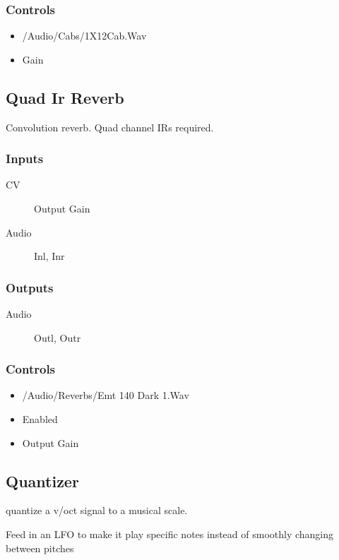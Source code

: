 \subsubsection{Controls}
\begin{itemize}
\item /Audio/Cabs/1X12Cab.Wav
\item Gain
\end{itemize}

\subsection{Quad Ir Reverb}

Convolution reverb. Quad channel IRs required.



\subsubsection{Inputs}
\begin{description}
\item [CV] Output Gain
\item [Audio] Inl, Inr
\end{description}

\subsubsection{Outputs}
\begin{description}
\item [Audio] Outl, Outr
\end{description}

\subsubsection{Controls}
\begin{itemize}
\item /Audio/Reverbs/Emt 140 Dark 1.Wav
\item Enabled
\item Output Gain
\end{itemize}

\subsection{Quantizer}

quantize a v/oct signal to a musical scale.

Feed in an LFO to make it play specific notes instead of smoothly changing between pitches

